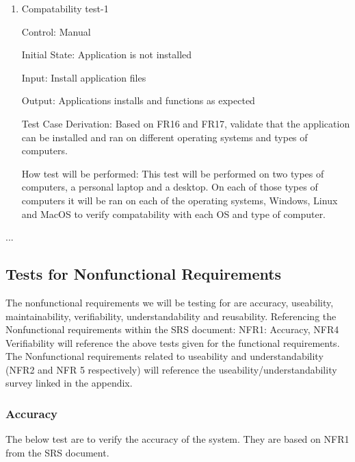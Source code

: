 \documentclass[12pt, titlepage]{article}
\begin{document}
  \begin{enumerate}
  \item {Compatability test-1\\}
  
  Control: Manual
            
  Initial State: Application is not installed
            
  Input: Install application files
            
  Output: Applications installs and functions as expected
  
  Test Case Derivation: Based on FR16 and FR17, validate that the application can be installed and ran on different operating systems and types of computers. 
  
  How test will be performed: This test will be performed on two types of computers, a personal laptop and a desktop. On each of those types of computers it will be ran on each of the operating systems, Windows, Linux and MacOS to verify compatability with each OS and type of computer.

  \end{enumerate}
...

\subsection{Tests for Nonfunctional Requirements}

\noindent The nonfunctional requirements we will be testing for are accuracy, useability, maintainability, verifiability, understandability and reusability. 
Referencing the Nonfunctional requirements within the SRS document: NFR1: Accuracy, NFR4 Verifiability will reference the above tests given for the functional requirements. 
The Nonfunctional requirements related to useability and understandability (NFR2 and NFR 5 respectively) will reference the useability/understandability survey linked in the appendix.

\subsubsection{Accuracy}

The below test are to verify the accuracy of the system.
They are based on NFR1 from the SRS document.
\end{document}
